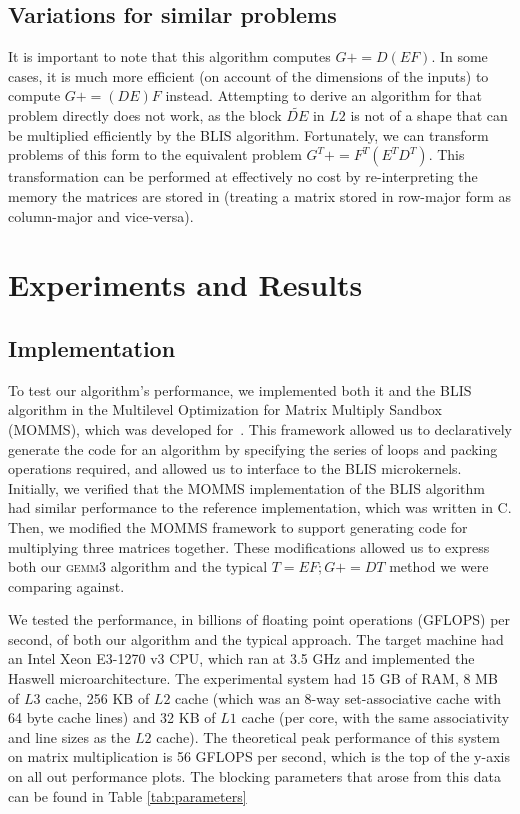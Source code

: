 \documentclass[12pt]{article}
\newcommand*{\pluseq}{\mathrel{{+}{=}}}
\newcommand*{\gemmt}{{\textsc{gemm3}}}
\newcommand*{\mycite}[1]{~\cite{#1}}
\begin{document}
\subsection{Variations for similar problems}
It is important to note that this algorithm computes $G \pluseq D(EF)$.
In some cases, it is much more efficient (on account of the dimensions of the inputs) to compute $G \pluseq (DE)F$ instead.
Attempting to derive an algorithm for that problem directly does not work, as the block $\widetilde{DE}$ in $L2$ is not of a shape that can be multiplied efficiently by the BLIS algorithm.
Fortunately, we can transform problems of this form to the equivalent problem $G^T \pluseq F^T(E^TD^T)$.
This transformation can be performed at effectively no cost by re-interpreting the memory the matrices are stored in (treating a matrix stored in row-major form as column-major and vice-versa).

\section{Experiments and Results}
\subsection{Implementation}
To test our algorithm's performance, we implemented both it and the BLIS algorithm in the Multilevel Optimization for Matrix Multiply Sandbox (MOMMS), which was developed for\mycite{SmithDiss2017}.
This framework allowed us to declaratively generate the code for an algorithm by specifying the series of loops and packing operations required, and allowed us to interface to the BLIS microkernels.
Initially, we verified that the MOMMS implementation of the BLIS algorithm had similar performance to the reference implementation, which was written in C.
Then, we modified the MOMMS framework to support generating code for multiplying three matrices together.
These modifications allowed us to express both our \gemmt{} algorithm and the typical $T = EF; G \pluseq DT$ method we were comparing against.

We tested the performance, in billions of floating point operations (GFLOPS) per second, of both our algorithm and the typical approach.
The target machine had an Intel Xeon E3-1270 v3 CPU, which ran at 3.5 GHz and implemented the Haswell microarchitecture.
The experimental system had 15 GB of RAM, 8 MB of $L3$ cache, 256 KB of $L2$ cache (which was an 8-way set-associative cache with 64 byte cache lines) and 32 KB of $L1$ cache (per core, with the same associativity and line sizes as the $L2$ cache).
The theoretical peak performance of this system on matrix multiplication is 56 GFLOPS per second, which is the top of the y-axis on all out performance plots.
The blocking parameters that arose from this data can be found in Table \ref{tab:parameters}
\end{document}
